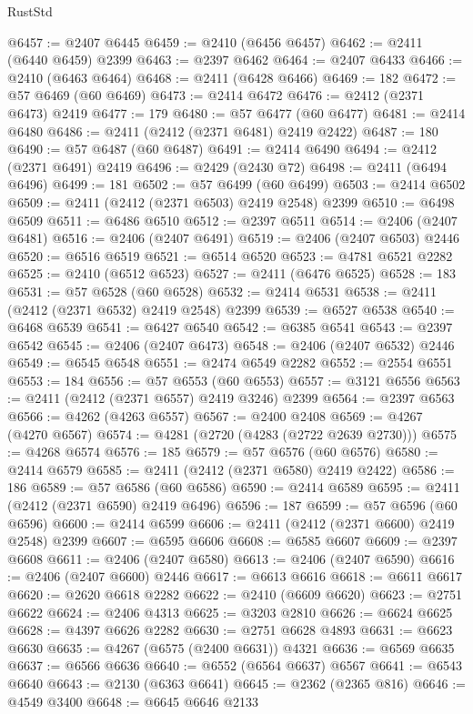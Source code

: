 \begin{lexlean}{RustStd}
\begin{coremodule}
@6457 := @2407 @6445
@6459 := @2410 (@6456 @6457)
@6462 := @2411 (@6440 @6459) @2399
@6463 := @2397 @6462
@6464 := @2407 @6433
@6466 := @2410 (@6463 @6464)
@6468 := @2411 (@6428 @6466)
@6469 := 182
@6472 := @57 @6469 (@60 @6469)
@6473 := @2414 @6472
@6476 := @2412 (@2371 @6473) @2419
@6477 := 179
@6480 := @57 @6477 (@60 @6477)
@6481 := @2414 @6480
@6486 := @2411 (@2412 (@2371 @6481) @2419 @2422)
@6487 := 180
@6490 := @57 @6487 (@60 @6487)
@6491 := @2414 @6490
@6494 := @2412 (@2371 @6491) @2419
@6496 := @2429 (@2430 @72)
@6498 := @2411 (@6494 @6496)
@6499 := 181
@6502 := @57 @6499 (@60 @6499)
@6503 := @2414 @6502
@6509 := @2411 (@2412 (@2371 @6503) @2419 @2548) @2399
@6510 := @6498 @6509
@6511 := @6486 @6510
@6512 := @2397 @6511
@6514 := @2406 (@2407 @6481)
@6516 := @2406 (@2407 @6491)
@6519 := @2406 (@2407 @6503) @2446
@6520 := @6516 @6519
@6521 := @6514 @6520
@6523 := @4781 @6521 @2282
@6525 := @2410 (@6512 @6523)
@6527 := @2411 (@6476 @6525)
@6528 := 183
@6531 := @57 @6528 (@60 @6528)
@6532 := @2414 @6531
@6538 := @2411 (@2412 (@2371 @6532) @2419 @2548) @2399
@6539 := @6527 @6538
@6540 := @6468 @6539
@6541 := @6427 @6540
@6542 := @6385 @6541
@6543 := @2397 @6542
@6545 := @2406 (@2407 @6473)
@6548 := @2406 (@2407 @6532) @2446
@6549 := @6545 @6548
@6551 := @2474 @6549 @2282
@6552 := @2554 @6551
@6553 := 184
@6556 := @57 @6553 (@60 @6553)
@6557 := @3121 @6556
@6563 := @2411 (@2412 (@2371 @6557) @2419 @3246) @2399
@6564 := @2397 @6563
@6566 := @4262 (@4263 @6557)
@6567 := @2400 @2408
@6569 := @4267 (@4270 @6567)
@6574 := @4281 (@2720 (@4283 (@2722 @2639 @2730)))
@6575 := @4268 @6574
@6576 := 185
@6579 := @57 @6576 (@60 @6576)
@6580 := @2414 @6579
@6585 := @2411 (@2412 (@2371 @6580) @2419 @2422)
@6586 := 186
@6589 := @57 @6586 (@60 @6586)
@6590 := @2414 @6589
@6595 := @2411 (@2412 (@2371 @6590) @2419 @6496)
@6596 := 187
@6599 := @57 @6596 (@60 @6596)
@6600 := @2414 @6599
@6606 := @2411 (@2412 (@2371 @6600) @2419 @2548) @2399
@6607 := @6595 @6606
@6608 := @6585 @6607
@6609 := @2397 @6608
@6611 := @2406 (@2407 @6580)
@6613 := @2406 (@2407 @6590)
@6616 := @2406 (@2407 @6600) @2446
@6617 := @6613 @6616
@6618 := @6611 @6617
@6620 := @2620 @6618 @2282
@6622 := @2410 (@6609 @6620)
@6623 := @2751 @6622
@6624 := @2406 @4313
@6625 := @3203 @2810
@6626 := @6624 @6625
@6628 := @4397 @6626 @2282
@6630 := @2751 @6628 @4893
@6631 := @6623 @6630
@6635 := @4267 (@6575 (@2400 @6631)) @4321
@6636 := @6569 @6635
@6637 := @6566 @6636
@6640 := @6552 (@6564 @6637) @6567
@6641 := @6543 @6640
@6643 := @2130 (@6363 @6641)
@6645 := @2362 (@2365 @816)
@6646 := @4549 @3400
@6648 := @6645 @6646 @2133

\end{coremodule}
\end{lexlean}
